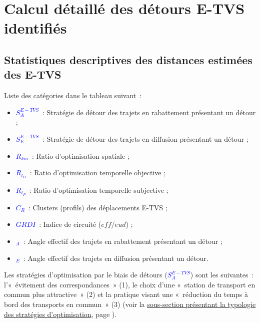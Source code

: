     \newpage
\section{Calcul détaillé des détours \acrshort{E-TVS} identifiés}
    \label{donnees-ouvertes:calcul_detours}

    \newpage
\subsection{Statistiques descriptives des distances estimées des \acrshort{E-TVS}}
    \label{donnees-ouvertes:statistiques_detours}
    
Liste des catégories dans le tableau suivant~:
\begin{itemize}
    \item \textcolor{blue}{$S^{E-TVS}_{A}$}~: Stratégie de détour des trajets en \gls{rabattement} présentant un détour ;
    \item \textcolor{blue}{$S^{E-TVS}_{E}$}~: Stratégie de détour des trajets en \gls{diffusion} présentant un détour ;
    \item \textcolor{blue}{$R_{km}$}~: Ratio d'optimisation spatiale ;
    \item \textcolor{blue}{$R_{t_O}$}~: Ratio d'optimisation temporelle objective ;
    \item \textcolor{blue}{$R_{t_P}$}~: Ratio d'optimisation temporelle subjective ;
    \item \textcolor{blue}{$C_{R}$}~: Clusters (profils) des déplacements \acrshort{E-TVS} ;
    \item \textcolor{blue}{$ GRDI $}~: Indice de circuité ($eff/eud$) ;
    \item \textcolor{blue}{\alpha$_A$}~: Angle effectif des trajets en \gls{rabattement} présentant un détour ;
    \item \textcolor{blue}{\alpha$_E$}~: Angle effectif des trajets en \gls{diffusion} présentant un détour.
\end{itemize}
    
Les stratégies d'optimisation par le biais de détours (\textcolor{blue}{$S^{E-TVS}_{A}$}) sont les suivantes~: l'«~évitement des correspondances~» (1), le choix d'une «~station de transport en commun plus attractive~» (2) et la pratique visant une «~réduction du temps à bord des transports en commun~» (3) (voir la \hyperref[Typologie des stratégies d'optimisation basées sur les détours et les pauses]{sous-section présentant la typologie des stratégies d'optimisation}, page \pageref{Typologie des stratégies d'optimisation basées sur les détours et les pauses}).\par


